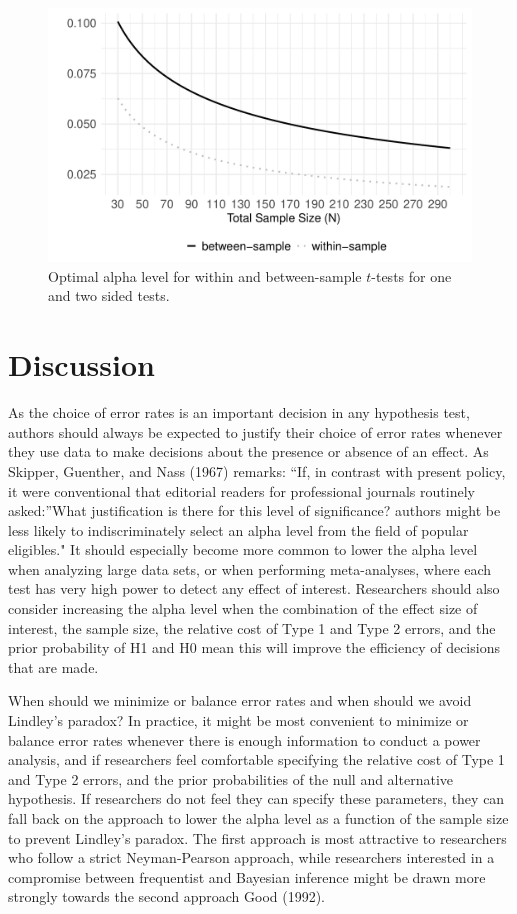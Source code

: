 \documentclass[
  english,
  ,jou, a4paper,floatsintext]{apa6}
\begin{document}
\begin{figure}
\centering
\includegraphics{Justify_in_Practice_files/figure-latex/lindleyplot-1.pdf}
\caption{\label{fig:lindleyplot}Optimal alpha level for within and between-sample \(t\)-tests for one and two sided tests.}
\end{figure}

\hypertarget{discussion}{%
\section{Discussion}\label{discussion}}

As the choice of error rates is an important decision in any hypothesis test, authors should always be expected to justify their choice of error rates whenever they use data to make decisions about the presence or absence of an effect. As Skipper, Guenther, and Nass (1967) remarks: ``If, in contrast with present policy, it were conventional that editorial readers for professional journals routinely asked:''What justification is there for this level of significance? authors might be less likely to indiscriminately select an alpha level from the field of popular eligibles." It should especially become more common to lower the alpha level when analyzing large data sets, or when performing meta-analyses, where each test has very high power to detect any effect of interest. Researchers should also consider increasing the alpha level when the combination of the effect size of interest, the sample size, the relative cost of Type 1 and Type 2 errors, and the prior probability of H1 and H0 mean this will improve the efficiency of decisions that are made.

When should we minimize or balance error rates and when should we avoid Lindley's paradox? In practice, it might be most convenient to minimize or balance error rates whenever there is enough information to conduct a power analysis, and if researchers feel comfortable specifying the relative cost of Type 1 and Type 2 errors, and the prior probabilities of the null and alternative hypothesis. If researchers do not feel they can specify these parameters, they can fall back on the approach to lower the alpha level as a function of the sample size to prevent Lindley's paradox. The first approach is most attractive to researchers who follow a strict Neyman-Pearson approach, while researchers interested in a compromise between frequentist and Bayesian inference might be drawn more strongly towards the second approach Good (1992).
\end{document}
